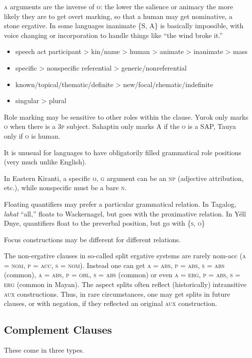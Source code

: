 \documentclass[11pt]{article}
\newcommand{\I}[1]{\textsc{#1}}   %
\newenvironment{grammarlist}%
 {\begin{itemize}\addtolength{\itemsep}{-0.5\baselineskip}\ignorespaces}%
 {\end{itemize}\ignorespacesafterend}
\begin{document}
\I{a} arguments are the inverse of \I{o}: the lower the salience or
animacy the more likely they are to get overt marking, so that a human
may get nominative, a stone ergative.  In some languages inanimate
\{\I{S, A}\} is basically impossible, with voice changing or
incorporation to handle things like ``the wind broke it.''

\begin{grammarlist}
  \item speech act participant > kin/name > human > animate >
    inanimate > mass
  \item specific > nonspecific referential > generic/nonreferential
  \item known/topical/thematic/definite > new/focal/rhematic/indefinite
  \item singular > plural
\end{grammarlist}

Role marking may be sensitive to other roles within the clause.  Yurok
only marks \I{o} when there is a \I{3p} subject.  Sahaptin only marks
\I{A} if the \I{o} is a SAP, Tauya only if \I{o} is human.

It is unusual for languages to have obligatorily filled grammatical
role positions (very much unlike English).

In Eastern Kiranti, a specific \I{o, g} argument can be an \I{np}
(adjective attribution, etc.), while nonspecific must be a bare
\I{n}.

Floating quantifiers may prefer a particular grammatical relation.  In
Tagalog, \textit{lahat} ``all,'' floats to Wackernagel, but goes with
the proximative relation.  In Yélî Dnye, quantifiers float to the
preverbal position, but go with \{\I{s, o}\}

Focus constructions may be different for different relations.

The non-ergative clauses in so-called split ergative systems are
rarely nom-acc (\I{a = nom, p = acc, s = nom}).  Instead one can get
\I{a = abs, p = abs, s = abs} (common), \I{a = abs, p = obl, s = abs}
(common) or even \I{a = erg, p = abs, s = erg} (common in Mayan).  The
aspect splits often reflect (historically) intransitive \I{aux}
constructions.  Thus, in rare circumstances, one may get splits in
future clauses, or with negation, if they reflected an original
\I{aux} construction.


\subsection{Complement Clauses}
These come in three types.
\end{document}
